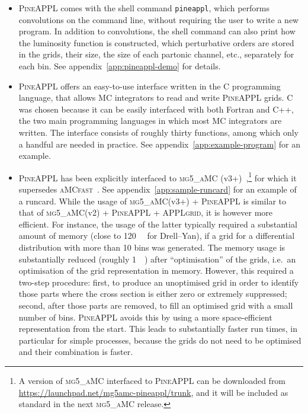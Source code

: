 \begin{itemize}

\item \textsc{PineAPPL} comes with the shell command \texttt{pineappl}, which performs convolutions on the command line, without requiring the user to write a new program.
In addition to convolutions, the shell command can also print how the luminosity function is constructed, which perturbative orders are stored in the grids, their size, the size of each partonic channel, etc., separately for each bin. See appendix~\ref{app:pineappl-demo} for details.
  
\item \textsc{PineAPPL} offers an easy-to-use interface written in the C programming language, that allows MC integrators to read and write \textsc{PineAPPL} grids.
C was chosen because it can be easily interfaced with both Fortran and C++, the two main programming languages in which most MC integrators are written.
The interface consists of roughly thirty functions, among which only a handful are needed in practice.
See appendix~\ref{app:example-program} for an example.

\item \textsc{PineAPPL} has been explicitly interfaced to \textsc{mg5\_aMC} (v3+)~\cite{Alwall:2014hca,Frederix:2018nkq},\footnote{A version of \textsc{mg5\_aMC} interfaced to \textsc{PineAPPL} can be downloaded from \url{https://launchpad.net/mg5amc-pineappl/trunk}, and it will be included as standard in the next \textsc{mg5\_aMC} release.} for which it supersedes \textsc{aMCfast}~\cite{Bertone:2014zva}. See appendix~\ref{app:sample-runcard} for an example of a runcard. While the usage of
\textsc{mg5\_aMC}(v3+) + \textsc{PineAPPL} is similar to that of 
\textsc{mg5\_aMC}(v2) + \textsc{PineAPPL} + \textsc{APPLgrid}, it is however more
efficient. For instance, the usage of the latter typically required a substantial amount of memory (close to \SI{120}{\giga\byte} for Drell--Yan), if a grid for a differential distribution with more than 10 bins was generated.
The memory usage is substantially reduced (roughly \SI{1}{\giga\byte}) after \enquote{optimisation} of the grids, i.e.\ an optimisation of the grid representation in memory.
However, this required a two-step procedure: first, to produce an unoptimised grid in order to identify those parts where the cross section is either zero or extremely suppressed; second, after those parts are removed, to fill an optimised grid with a small number of bins.
\textsc{PineAPPL} avoids this by using a more space-efficient representation from the start. This leads to substantially faster run times, in particular for simple processes, because the grids do not need to be optimised 
and their combination is faster.

\end{itemize}


